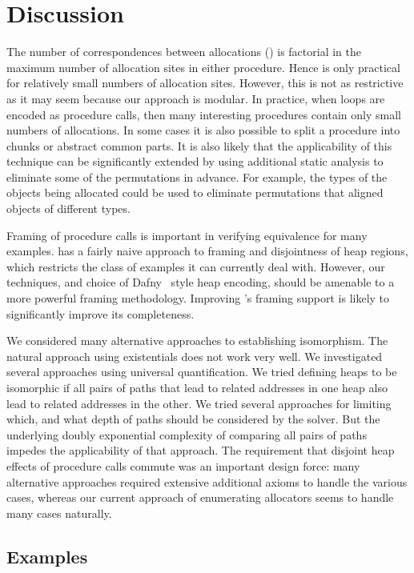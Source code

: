 \documentclass[runningheads,a4paper]{llncs}
\begin{document}
\section{Discussion}\label{sec:discussion}

The number of correspondences between allocations () is factorial in the maximum number of allocation sites in either procedure. Hence \metho{} is only practical for relatively small numbers of allocation sites. However, this is not as restrictive as it may seem because our approach is modular. In practice, when loops are encoded as procedure calls, then many interesting procedures contain only small numbers of allocations. In some cases it is also possible to split a procedure into chunks or abstract common parts. It is also likely that the applicability of this technique can be significantly extended by using additional static analysis to eliminate some of the permutations in advance. For example, the types of the objects being allocated could be used to eliminate permutations that aligned objects of different types.

Framing of procedure calls is important in verifying equivalence for many examples. \Tool{} has a fairly naive approach to framing and disjointness of heap regions, which restricts the class of examples it can currently deal with. However, our techniques, and choice of Dafny~\cite{Leino10} style heap encoding, should be amenable to a more powerful framing methodology. Improving \tool{}'s framing support is likely to significantly improve its completeness.

We considered many alternative approaches to establishing isomorphism. The natural approach using existentials does not work very well. We investigated several approaches using universal quantification. We tried defining heaps to be isomorphic if all pairs of paths that lead to related addresses in one heap also lead to related addresses in the other. We tried several approaches for limiting which, and what depth of paths should be considered by the solver. But the underlying doubly exponential complexity of comparing all pairs of paths impedes the applicability of that approach. The requirement that disjoint heap effects of procedure calls commute was an important design force: many alternative approaches required extensive additional axioms to handle the various cases, whereas our current approach of enumerating allocators seems to handle many cases naturally.

\subsection{Examples}
\end{document}
